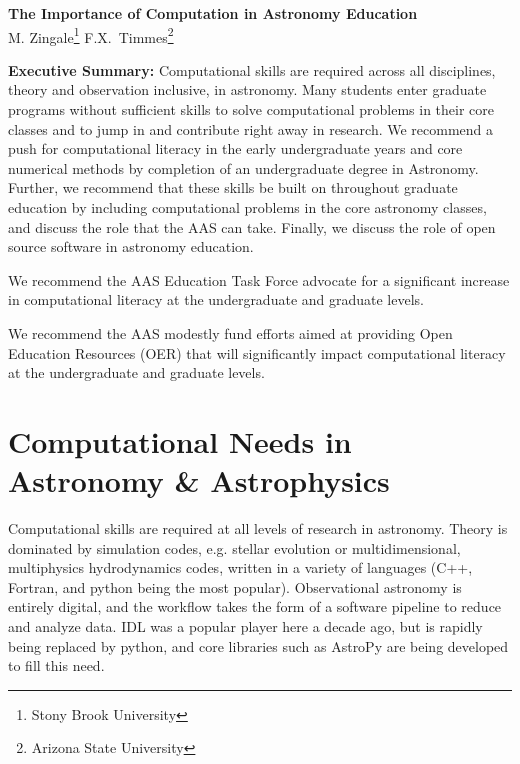 \documentclass[11pt]{article}
\begin{document}
\thispagestyle{plain}

\begin{center}
{\Large \sffamily \bfseries The Importance of Computation in Astronomy Education} \\
{
M. Zingale\footnote{Stony Brook University}
F.X.~Timmes\footnote{Arizona State University}
}
\end{center}

\begin{tcolorbox}
{\sffamily \bfseries Executive Summary:} Computational skills are required
across all disciplines, theory and observation inclusive, in astronomy.
Many students enter graduate programs without sufficient skills
to solve computational problems in their core classes and to jump in and
contribute right away in research.  We recommend a push for computational
literacy in the early undergraduate years and core numerical methods by
completion of an undergraduate degree in Astronomy.  Further, we recommend
that these skills be built on throughout graduate education by including
computational problems in the core astronomy classes, and discuss
the role that the AAS can take.  Finally, we discuss
the role of open source software in astronomy education.

\vspace {0.1in} We recommend the AAS Education Task Force advocate for
a significant increase in computational literacy at the undergraduate
and graduate levels.

\vspace {0.1in} We recommend the AAS modestly fund efforts aimed at
providing Open Education Resources (OER) that will significantly
impact computational literacy at the undergraduate and graduate
levels.


\end{tcolorbox}

\section{Computational Needs in Astronomy \& Astrophysics}

Computational skills are required at all levels of research in
astronomy.  Theory is dominated by simulation codes, e.g. stellar
evolution or multidimensional, multiphysics hydrodynamics codes,
written in a variety of languages (C++, Fortran, and python being the
most popular).  Observational astronomy is entirely digital, and the
workflow takes the form of a software pipeline to reduce and analyze
data.  IDL was a popular player here a decade ago, but is rapidly
being replaced by python, and core libraries such as AstroPy are being
developed to fill this need.
\end{document}
